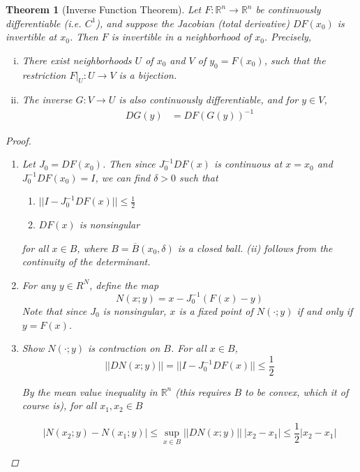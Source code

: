\documentclass{article}
\newtheorem{theorem}{Theorem}[section]
\def\R{{\mathbb R}}
\begin{document}
\begin{theorem}[Inverse Function Theorem]
Let $F: \R^n \rightarrow \R^n$ be continuously differentiable (i.e. $C^1$), and suppose the Jacobian (total derivative) $DF(x_0)$ is invertible at $x_0$. Then $F$ is invertible in a neighborhood of $x_0$. Precisely,

\begin{enumerate}[(i)]
\item There exist neighborhoods $U$ of $x_0$ and $V$ of $y_0 = F(x_0)$, such that the restriction $F|_U: U \rightarrow V$ is a bijection.
\item The inverse $G: V \rightarrow U$ is also continuously differentiable, and for $y \in V$,
\begin{align}
DG(y) &= DF(G(y))^{-1}
\end{align}
\end{enumerate}

\begin{proof}
\begin{enumerate}

\item Let $J_0 = DF(x_0)$. Then since $J_0^{-1} DF(x)$ is continuous at $x = x_0$ and $J_0^{-1} DF(x_0) = I$, we can find $\delta > 0$ such that

\begin{enumerate}
\item $||I - J_0^{-1} DF(x)|| \leq \frac{1}{2}$
\item $DF(x)$ is nonsingular
\end{enumerate}

for all $x \in B$, where $B = \overline{B}(x_0, \delta)$ is a closed ball. (ii) follows from the continuity of the determinant.

\item For any $y \in R^N$, define the map
\begin{equation}
N(x; y) = x - J_0^{-1}(F(x) - y)
\end{equation}
Note that since $J_0$ is nonsingular, $x$ is a fixed point of $N(\cdot; y)$ if and only if $y = F(x)$.

\item Show $N(\cdot; y)$ is contraction on $B$. For all $x \in B$, 
\[
||DN(x; y)|| = ||I - J_0^{-1} DF(x)|| \leq \frac{1}{2}
\]

By the mean value inequality in $\R^n$ (this requires $B$ to be convex, which it of course is), for all $x_1, x_2 \in B$

\[
|N(x_2; y) - N(x_1; y)| \leq \sup_{x \in B} ||DN(x; y)|| \: |x_2 - x_1| \leq \frac{1}{2}|x_2 - x_1|
\]


\end{enumerate}
\end{proof}
\end{theorem}
\end{document}
